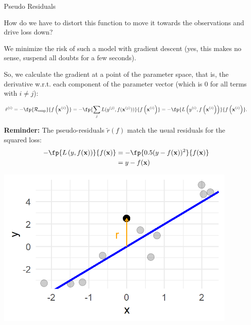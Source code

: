 \begin{vbframe}{Pseudo Residuals}
\begin{footnotesize}
How do we have to distort this function to move it towards the observations and drive loss down?

\vspace*{0.2cm}
We minimize the risk of such a model with gradient descent (yes, this makes no sense,
suspend all doubts for a few seconds).

So, we calculate the gradient at a point of the parameter space, that is, the derivative w.r.t. each component of the parameter vector (which is 0 for all terms with $i \neq j$):

$$
\tilde{r}^{(i)} = - \fp{\riske}{\fxi} = - \fp{\sum_j L(y^{(j)}, f(\xv^{(j)}))}{\fxi} = - \fp{\Lxyi}{\fxi}.
$$

\vspace*{0.5cm}

\begin{minipage}[b]{0.45\textwidth}
  \raggedright
  \textbf{Reminder:} The pseudo-residuals 
  $\tilde{r}\left( f \right)$ 
  match the usual residuals for 
  the squared loss:
  \begin{align*}
  - \fp{\Lxy}{\fx} & = - \fp{0.5(y - \fx)^2}{\fx}\\ 
                   & = y - \fx
  \end{align*}
\end{minipage}%
\begin{minipage}[b]{0.05\textwidth}
   \phantom{foo}
\end{minipage}
\begin{minipage}[b]{0.45\textwidth}
  \includegraphics[width=0.9\textwidth]{figure/pseudo_residual_1.png}
\end{minipage}

\end{footnotesize}

\end{vbframe}

